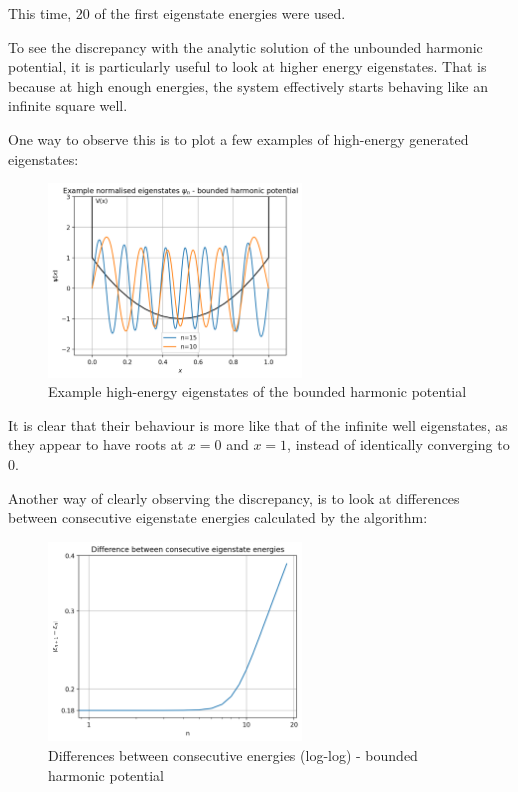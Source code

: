 \documentclass[11pt]{article}
\begin{document}
This time, 20 of the first eigenstate energies were used.

To see the discrepancy with the analytic solution of the unbounded harmonic potential,
it is particularly useful to look at higher energy eigenstates. That is because
at high enough energies, the system effectively starts behaving like an infinite
square well.

One way to observe this is to plot a few examples of high-energy generated eigenstates:

\begin{figure}[h]
  \centering
  \includegraphics[width=0.6\textwidth]{ex_eigenstates3.png}
  \caption{Example high-energy eigenstates of the bounded harmonic potential}
\end{figure}

It is clear that their behaviour is more like that of the infinite well eigenstates,
as they appear to have roots at $x=0$ and $x=1$, instead of identically 
converging to 0.

Another way of clearly observing the discrepancy, is to look at differences between
consecutive eigenstate energies calculated by the algorithm: 

\begin{figure}[h]
  \centering
  \includegraphics[width=0.6\textwidth]{diff_energies.png}
  \caption{Differences between consecutive energies (log-log) - bounded harmonic potential}
\end{figure}
\end{document}
